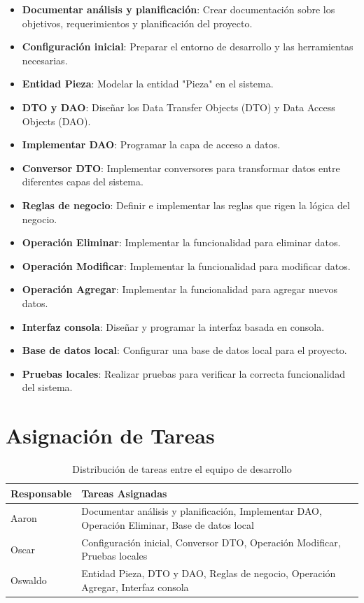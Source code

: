 \begin{itemize}
    \item \textbf{Documentar análisis y planificación}: Crear documentación sobre los objetivos, requerimientos y planificación del proyecto.
    \item \textbf{Configuración inicial}: Preparar el entorno de desarrollo y las herramientas necesarias.
    \item \textbf{Entidad Pieza}: Modelar la entidad "Pieza" en el sistema.
    \item \textbf{DTO y DAO}: Diseñar los Data Transfer Objects (DTO) y Data Access Objects (DAO).
    \item \textbf{Implementar DAO}: Programar la capa de acceso a datos.
    \item \textbf{Conversor DTO}: Implementar conversores para transformar datos entre diferentes capas del sistema.
    \item \textbf{Reglas de negocio}: Definir e implementar las reglas que rigen la lógica del negocio.
    \item \textbf{Operación Eliminar}: Implementar la funcionalidad para eliminar datos.
    \item \textbf{Operación Modificar}: Implementar la funcionalidad para modificar datos.
    \item \textbf{Operación Agregar}: Implementar la funcionalidad para agregar nuevos datos.
    \item \textbf{Interfaz consola}: Diseñar y programar la interfaz basada en consola.
    \item \textbf{Base de datos local}: Configurar una base de datos local para el proyecto.
    \item \textbf{Pruebas locales}: Realizar pruebas para verificar la correcta funcionalidad del sistema.
\end{itemize}

\section{Asignación de Tareas}

\begin{table}[h]
    \centering
    \renewcommand{\arraystretch}{1.3}
    \begin{tabular}{|p{4cm}|p{10cm}|}
        \hline
        \textbf{Responsable} & \textbf{Tareas Asignadas} \\
        \hline
        Aaron & Documentar análisis y planificación, Implementar DAO, Operación Eliminar, Base de datos local \\
        \hline
        Oscar & Configuración inicial, Conversor DTO, Operación Modificar, Pruebas locales \\
        \hline
        Oswaldo & Entidad Pieza, DTO y DAO, Reglas de negocio, Operación Agregar, Interfaz consola \\
        \hline
    \end{tabular}
    \caption{Distribución de tareas entre el equipo de desarrollo}
\end{table}


